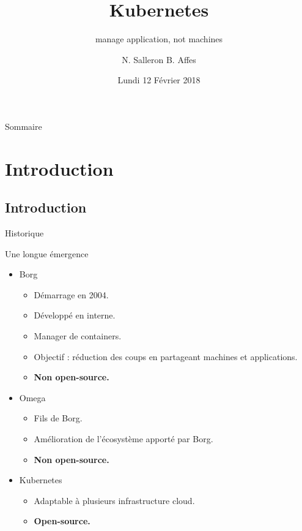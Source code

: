 \documentclass{bredelebeamer}
\title[Kubernetes]{Kubernetes}
\subtitle{manage application, not machines}
\author{N. Salleron B. Affes}
\date{Lundi 12 Février 2018}
\begin{document}
\begin{frame}
  \titlepage
\end{frame}

\begin{frame}{Sommaire}
  \tableofcontents
\end{frame}

\section{Introduction}
\subsection{Introduction}

\begin{frame}{Historique}
\begin{block}{Une longue émergence}
\begin{itemize}
\item Borg
	\begin{itemize}
	\item Démarrage en 2004.
	\item Développé en interne.
	\item Manager de containers.
	\item Objectif : réduction des coups en partageant machines et applications.
	\item \textbf{Non open-source.}
	\end{itemize}	\pause
\item Omega	
	\begin{itemize}
	\item Fils de Borg.
	\item Amélioration de l'écosystème apporté par Borg.
	\item  \textbf{Non open-source.}
	\end{itemize}   \pause
\item Kubernetes
	\begin{itemize}
	\item Adaptable à plusieurs infrastructure cloud.
	\item  \textbf{Open-source.}
	\end{itemize}
\end{itemize}
\end{block}
\end{frame}
\end{document}
